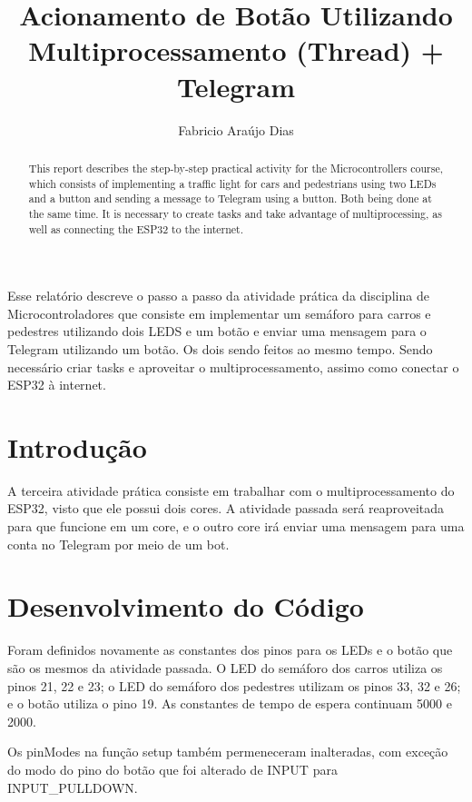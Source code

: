 \documentclass[12pt]{article}
\title{Acionamento de Botão Utilizando Multiprocessamento (Thread) + Telegram}
\author{Fabricio Araújo Dias}
\begin{document}
 

\maketitle

\begin{abstract}
  This report describes the step-by-step practical activity for the Microcontrollers course, which consists of implementing a traffic light for cars and pedestrians using two LEDs and a button and sending a message to Telegram using a button. Both being done at the same time. It is necessary to create tasks and take advantage of multiprocessing, as well as connecting the ESP32 to the internet.
\end{abstract}
     
\begin{resumo} 
  Esse relatório descreve o passo a passo da atividade prática da disciplina de Microcontroladores que consiste em implementar um semáforo para carros e pedestres utilizando dois LEDS e um botão e enviar uma mensagem para o Telegram utilizando um botão. Os dois sendo feitos ao mesmo tempo. Sendo necessário criar tasks e aproveitar o multiprocessamento, assimo como conectar o ESP32 à internet.
\end{resumo}


\section{Introdução}\label{sec:introdução}
A terceira atividade prática consiste em trabalhar com o multiprocessamento do ESP32, visto que ele possui dois cores. A atividade passada será reaproveitada para que funcione em um core, e o outro core irá enviar uma mensagem para uma conta no Telegram por meio de um bot.

\section{Desenvolvimento do Código}\label{sec:desenvolvimento-do-código}

Foram definidos novamente as constantes dos pinos para os LEDs e o botão que são os mesmos da atividade passada. O LED do semáforo dos carros utiliza os pinos 21, 22 e 23; o LED do semáforo dos pedestres utilizam os pinos 33, 32 e 26; e o botão utiliza o pino 19. As constantes de tempo de espera continuam 5000 e 2000.

Os pinModes na função setup também permeneceram inalteradas, com exceção do modo do pino do botão que foi alterado de INPUT para INPUT\_PULLDOWN.
\end{document}
